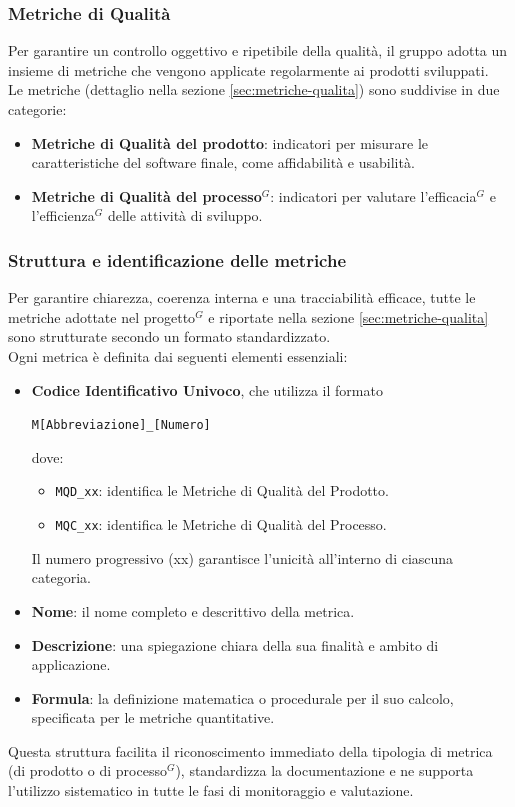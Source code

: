 \subsubsection{Metriche di Qualità}
Per garantire un controllo oggettivo e ripetibile della qualità, il gruppo adotta un insieme di metriche che vengono applicate regolarmente ai prodotti sviluppati.\\
Le metriche (dettaglio nella sezione \ref{sec:metriche-qualita}) sono suddivise in due categorie:
\begin{itemize}[itemsep=3pt, parsep=1pt, label=$\scriptstyle\bullet$]
    \item \textbf{Metriche di Qualità del prodotto}: indicatori per misurare le caratteristiche del software finale, come affidabilità e usabilità.
    \item \textbf{Metriche di Qualità del processo$^G$}: indicatori per valutare l'efficacia$^G$ e l'efficienza$^G$ delle attività di sviluppo.
\end{itemize}

\subsubsection{Struttura e identificazione delle metriche}
\label{sec:struttura-metriche}
Per garantire chiarezza, coerenza interna e una tracciabilità efficace, tutte le metriche adottate nel progetto$^G$ e riportate nella sezione \ref{sec:metriche-qualita} sono strutturate secondo un formato standardizzato.\\
Ogni metrica è definita dai seguenti elementi essenziali:
\begin{itemize}[itemsep=3pt, parsep=1pt, label=$\scriptstyle\bullet$]
    \item \textbf{Codice Identificativo Univoco}, che utilizza il formato 
    \begin{center}
        \texttt{M[Abbreviazione]\_[Numero]}
    \end{center}
    dove:
    \begin{itemize}[label=\textendash, itemsep=0pt, parsep=1pt, leftmargin=1.5em]
        \item \texttt{MQD\_xx}: identifica le Metriche di Qualità del Prodotto.
        \item \texttt{MQC\_xx}: identifica le Metriche di Qualità del Processo.
    \end{itemize}
    Il numero progressivo (xx) garantisce l'unicità all'interno di ciascuna categoria.
    \item \textbf{Nome}: il nome completo e descrittivo della metrica.
    \item \textbf{Descrizione}: una spiegazione chiara della sua finalità e ambito di applicazione.
    \item \textbf{Formula}: la definizione matematica o procedurale per il suo calcolo, specificata per le metriche quantitative.
\end{itemize}
Questa struttura facilita il riconoscimento immediato della tipologia di metrica (di prodotto o di processo$^G$), standardizza la documentazione e ne supporta l'utilizzo sistematico in tutte le fasi di monitoraggio e valutazione.

